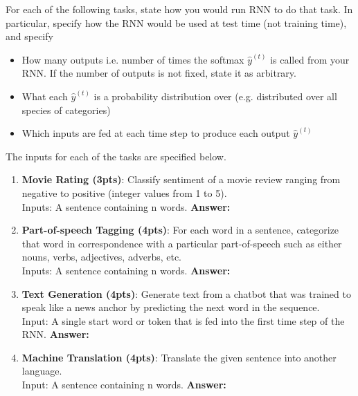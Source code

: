 \documentclass{assignment format}
\newenvironment{answer}{
    {\bf Answer:} \begingroup\color{red}
}{\endgroup}%
\begin{document}
For each of the following tasks, state how you would run RNN to do that task. In particular, specify how the RNN would be used at test time (not training time), and specify
\begin{itemize}
    \item How many outputs i.e. number of times the softmax $\hat{y}^{(t)}$ is called from your RNN. If the number of outputs is not fixed, state it as arbitrary.  
    \item What each $\hat{y}^{(t)}$ is a probability distribution over (e.g. distributed over all species of categories)
    \item Which inputs are fed at each time step to produce each output $\hat{y}^{(t)}$
    \end{itemize}
The inputs for each of the tasks are specified below.
\begin{enumerate}[label=(\alph*)]
    \item \textbf{Movie Rating (3pts)}: Classify sentiment of a movie review ranging from negative to positive (integer values from 1 to 5).\\Inputs: A sentence
    containing n words.
    \begin{answer}
    \end{answer}
    \item \textbf{Part-of-speech Tagging (4pts)}: For each word in a sentence, categorize that word in correspondence with a particular part-of-speech such as either nouns, verbs, adjectives, adverbs, etc.\\Inputs: A sentence containing n words.
    \begin{answer}
    \end{answer}
    \item \textbf{Text Generation (4pts)}: Generate text from a chatbot that was trained to speak like a news anchor by predicting the next word in the sequence. \\Input: A single start word or token that is fed into the first time step of the RNN.
    \begin{answer}
    \end{answer}
    \item \textbf{Machine Translation (4pts)}: Translate the given sentence into another language. \\Input: A sentence containing n words. 
    \begin{answer}
    \end{answer}
    \end{enumerate}
    
\end{document}
